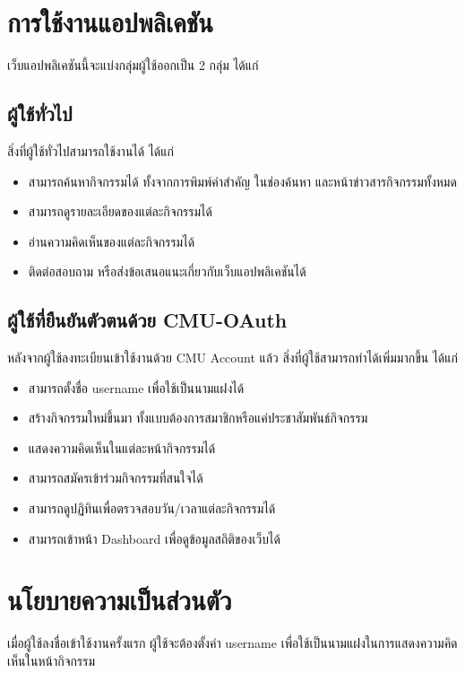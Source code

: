 \section{การใช้งานแอปพลิเคชัน}
เว็บแอปพลิเคชันนี้จะแบ่งกลุ่มผู้ใช้ออกเป็น 2 กลุ่ม ได้แก่
\subsection{ผู้ใช้ทั่วไป}
สิ่งที่ผู้ใช้ทั่วไปสามารถใช้งานได้ ได้แก่
\begin{itemize}
    \item สามารถค้นหากิจกรรมได้ ทั้งจากการพิมพ์คำสำคัญ ในช่องค้นหา และหน้าข่าวสารกิจกรรมทั้งหมด
    \item สามารถดูรายละเอียดของแต่ละกิจกรรมได้
    \item อ่านความคิดเห็นของแต่ละกิจกรรมได้
    \item ติดต่อสอบถาม หรือส่งข้อเสนอแนะเกี่ยวกับเว็บแอปพลิเคชันได้
\end{itemize}
\subsection{ผู้ใช้ที่ยืนยันตัวตนด้วย CMU-OAuth}
หลังจากผู้ใช้ลงทะเบียนเข้าใช้งานด้วย CMU Account แล้ว สิ่งที่ผู้ใช้สามารถทำได้เพิ่มมากขึ้น ได้แก่
\begin{itemize}
    \item สามารถตั้งชื่อ username เพื่อใช้เป็นนามแฝงได้
    \item สร้างกิจกรรมใหม่ขึ้นมา ทั้งแบบต้องการสมาชิกหรือแค่ประชาสัมพันธ์กิจกรรม
    \item แสดงความคิดเห็นในแต่ละหน้ากิจกรรมได้
    \item สามารถสมัครเข้าร่วมกิจกรรมที่สนใจได้
    \item สามารถดูปฏิทินเพื่อตรวจสอบวัน/เวลาแต่ละกิจกรรมได้
    \item สามารถเข้าหน้า Dashboard เพื่อดูข้อมูลสถิติของเว็บได้
\end{itemize}
\section{นโยบายความเป็นส่วนตัว}
เมื่อผู้ใช้ลงชื่อเข้าใช้งานครั้งแรก ผู้ใช้จะต้องตั้งค่า username เพื่อใช้เป็นนามแฝงในการแสดงความคิดเห็นในหน้ากิจกรรม

